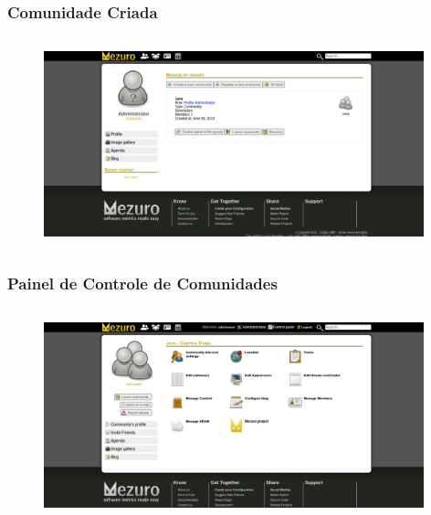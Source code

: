 \documentclass{beamer}
\begin{document}
    \begin{frame}
      \frametitle{Comunidade Criada}
      \framesubtitle{}

      \begin{figure}
        \begin{center}
          \includegraphics[width=11cm, height=6cm]{images/03-community-created.png}
          \label{fig:}
        \end{center}
      \end{figure}
    \end{frame}

    \begin{frame}
      \frametitle{Painel de Controle de Comunidades}
      \framesubtitle{}

      \begin{figure}
        \begin{center}
          \includegraphics[width=11cm, height=6cm]{images/04-community-control-panel.png}
          \label{fig:community-control-panel}
        \end{center}
      \end{figure}
    \end{frame}
\end{document}
